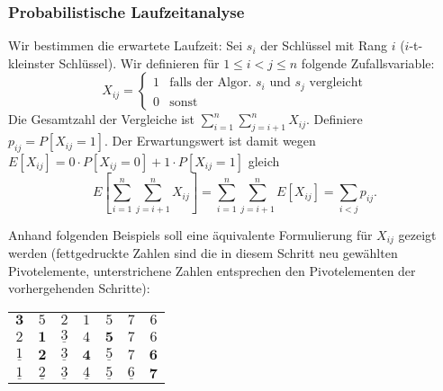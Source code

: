 \subsubsection{Probabilistische Laufzeitanalyse}
Wir bestimmen die erwartete Laufzeit: Sei $s_i$ der Schlüssel mit Rang $i$
($i$-t-kleinster Schlüssel). Wir definieren für $1 \leq i < j \leq n$ folgende
Zufallsvariable:
\[
  X_{ij} = \begin{cases} 1 & \text{falls der Algor. $s_i$ und $s_j$ vergleicht} \\
	  0 & \text{sonst} \end{cases}
\]
Die Gesamtzahl der Vergleiche ist $\sum_{i=1}^n \sum_{j=i+1}^n X_{ij}$.
Definiere $p_{ij} = P\left[X_{ij} = 1\right]$. Der Erwartungswert ist damit
wegen $E\left[X_{ij}\right] = 0 \cdot P\left[X_{ij} = 0\right] + 1 \cdot
P\left[X_{ij} = 1\right]$ gleich
\[
  E\left[\sum_{i=1}^n \sum_{j=i+1}^n X_{ij}\right] = \sum_{i=1}^n
  \sum_{j=i+1}^n E\left[X_{ij}\right] = \sum_{i<j} p_{ij}.
\]

Anhand folgenden Beispiels soll eine äquivalente Formulierung für $X_{ij}$
gezeigt werden (fettgedruckte Zahlen sind die in diesem Schritt neu gewählten
Pivotelemente, unterstrichene Zahlen entsprechen den Pivotelementen der
vorhergehenden Schritte):

\vspace{0.5cm}
\begin{minipage}{0.6\linewidth}
\renewcommand\arraystretch{1.3}
\centering
\begin{tabular}{ccccccc}
	$\mathbf{3}$ & $5$ & $2$ & $1$ & $5$ & $7$ & $6$ \\
	$2$ & $\mathbf{1}$ & $\underline{3}$ & $4$ & $\mathbf{5}$ & $7$ & $6$ \\
	$\underline{1}$ & $\mathbf{2}$ & $\underline{3}$ & $\mathbf{4}$ & $\underline{5}$ & $7$ & $\mathbf{6}$ \\
	$\underline{1}$ & $\underline{2}$ & $\underline{3}$ & $\underline{4}$ & $\underline{5}$ & $\underline{6}$ & $\mathbf{7}$
\end{tabular}
\end{minipage}\hfill\begin{minipage}{0.3\linewidth}
\end{minipage}
\vspace{0.5cm}


